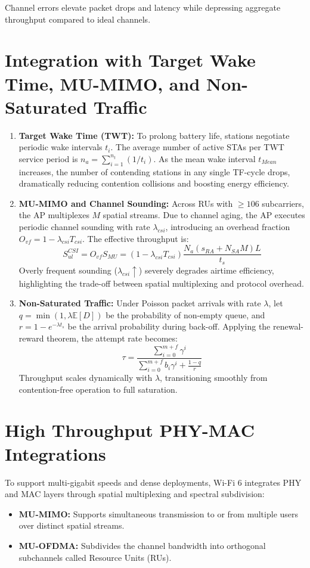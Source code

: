 Channel errors elevate packet drops and latency while depressing aggregate throughput compared to ideal channels.

\section{Integration with Target Wake Time, MU-MIMO, and Non-Saturated Traffic}
\begin{enumerate}
    \item \textbf{Target Wake Time (TWT):} To prolong battery life, stations negotiate periodic wake intervals $t_i$. The average number of active STAs per TWT service period is $n_a = \sum_{i=1}^{n_t} (1/t_i)$. As the mean wake interval $t_{Mean}$ increases, the number of contending stations in any single TF-cycle drops, dramatically reducing contention collisions and boosting energy efficiency.
    
    \item \textbf{MU-MIMO and Channel Sounding:} Across RUs with $\ge 106$ subcarriers, the AP multiplexes $M$ spatial streams. Due to channel aging, the AP executes periodic channel sounding with rate $\lambda_{csi}$, introducing an overhead fraction $O_{vf} = 1 - \lambda_{csi} T_{csi}$. The effective throughput is:
    \begin{equation}
        S_{ul}^{CSI} = O_{vf} S_{MU} = (1 - \lambda_{csi} T_{csi}) \frac{N_a (s_{RA} + N_{SA} M) L}{t_s}
    \end{equation}
    Overly frequent sounding ($\lambda_{csi} \uparrow$) severely degrades airtime efficiency, highlighting the trade-off between spatial multiplexing and protocol overhead.
    
    \item \textbf{Non-Saturated Traffic:} Under Poisson packet arrivals with rate $\lambda$, let $q = \min(1, \lambda \mathbb{E}[D])$ be the probability of non-empty queue, and $r = 1 - e^{-\lambda t_s}$ be the arrival probability during back-off. Applying the renewal-reward theorem, the attempt rate becomes:
    \begin{equation}
        \tau = \frac{\sum_{i=0}^{m+f} \gamma^i}{\sum_{i=0}^{m+f} b_i \gamma^i + \frac{1 - q}{r}}
    \end{equation}
    Throughput scales dynamically with $\lambda$, transitioning smoothly from contention-free operation to full saturation.
\end{enumerate}


\section{High Throughput PHY-MAC Integrations}
To support multi-gigabit speeds and dense deployments, Wi-Fi 6 integrates PHY and MAC layers through spatial multiplexing and spectral subdivision:
\begin{itemize}
    \item \textbf{MU-MIMO:} Supports simultaneous transmission to or from multiple users over distinct spatial streams.
    \item \textbf{MU-OFDMA:} Subdivides the channel bandwidth into orthogonal subchannels called Resource Units (RUs).
\end{itemize}

